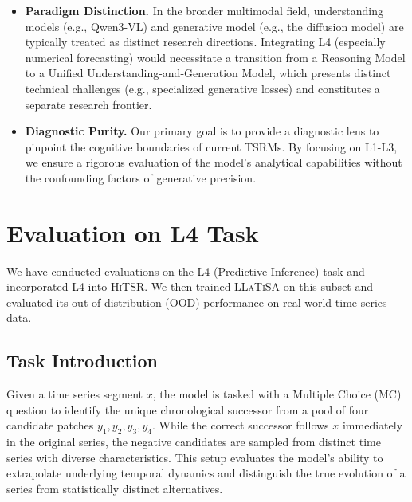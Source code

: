 \documentclass[11pt]{article}
\begin{document}
\begin{itemize}[left=0pt]
    \item \textbf{Paradigm Distinction.} In the broader multimodal field, understanding models (e.g., Qwen3-VL) and generative model (e.g., the diffusion model) are typically treated as distinct research directions. Integrating L4 (especially numerical forecasting) would necessitate a transition from a Reasoning Model to a Unified Understanding-and-Generation Model, which presents distinct technical challenges (e.g., specialized generative losses) and constitutes a separate research frontier.
    \item \textbf{Diagnostic Purity.} Our primary goal is to provide a diagnostic lens to pinpoint the cognitive boundaries of current TSRMs. By focusing on L1-L3, we ensure a rigorous evaluation of the model's analytical capabilities without the confounding factors of generative precision.
\end{itemize}

\section{Evaluation on L4 Task}
We have conducted evaluations on the L4 (Predictive Inference) task and incorporated L4 into \textsc{HiTSR}. We then trained \textsc{LLaTiSA} on this subset and evaluated its out-of-distribution (OOD) performance on real-world time series data.

\subsection{Task Introduction}
Given a time series segment $x$, the model is tasked with a Multiple Choice (MC) question to identify the unique chronological successor from a pool of four candidate patches $y_1, y_2, y_3, y_4$. While the correct successor follows $x$ immediately in the original series, the negative candidates are sampled from distinct time series with diverse characteristics. This setup evaluates the model's ability to extrapolate underlying temporal dynamics and distinguish the true evolution of a series from statistically distinct alternatives.
\end{document}
